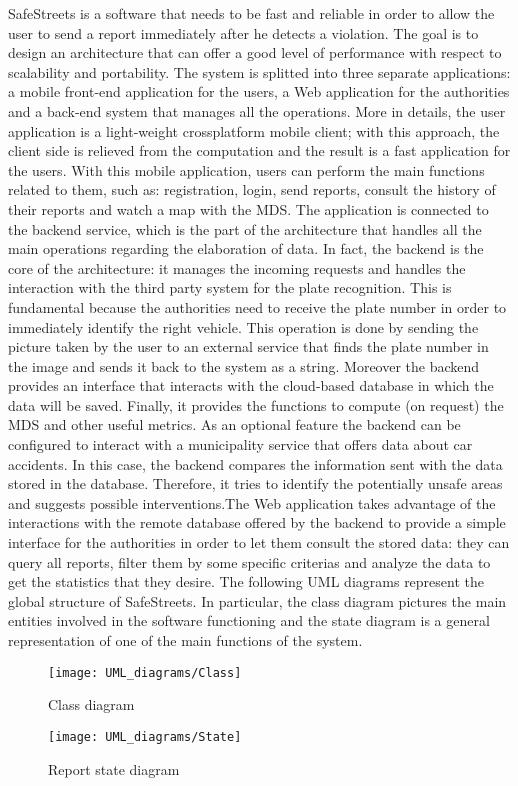 SafeStreets is a software that needs to be fast and reliable in order to allow the user to send a report immediately after he detects a violation. The goal is to design an architecture that can offer a good level of performance with respect to scalability and portability. The system is splitted into three separate applications: a mobile front-end application for the users, a Web application for the authorities and a back-end system that manages all the operations. More in details, the user application is a light-weight crossplatform mobile client; with this approach, the client side is relieved from the computation and the result is a fast application for the users. With this mobile application, users can perform the main functions related to them, such as: registration, login, send reports, consult the history of their reports and watch a map with the MDS. The application is connected to the backend service, which is the part of the architecture that handles all the main operations regarding the elaboration of data. In fact, the backend is the core of the architecture: it manages the incoming requests and handles the interaction with the third party system for the plate recognition. This is fundamental because the authorities need to receive the plate number in order to immediately identify the right vehicle. This operation is done by sending the picture taken by the user to an external service that finds the plate number in the image and sends it back to the system as a string. Moreover the backend provides an interface that interacts with the cloud-based database in which the data will be saved. Finally, it provides the functions to compute (on request) the MDS and other useful metrics. As an optional feature the backend can be configured to interact with a municipality service that offers data about car accidents. In this case, the backend compares the information sent with the data stored in the database. Therefore, it tries to identify the potentially unsafe areas and suggests possible interventions.\newline The Web application takes advantage of the interactions with the remote database offered by the backend to provide a simple interface for the authorities in order to let them consult the stored data: they can query all reports, filter them by some specific criterias and analyze the data to get the statistics that they desire. \newline
The following UML diagrams represent the global structure of SafeStreets. In particular, the class diagram pictures the main entities involved in the software functioning and the state diagram is a general representation of one of the main functions of the system.
\begin{figure}[H]
    \centering
    \texttt{[image: UML\_diagrams/Class]}
    \caption{Class diagram}
    \label{fig:class_diagram}
\end{figure}
\begin{figure}[H]
    \centering
    \texttt{[image: UML\_diagrams/State]}
    \caption{Report state diagram}
    \label{fig:state}
\end{figure}
\newpage
